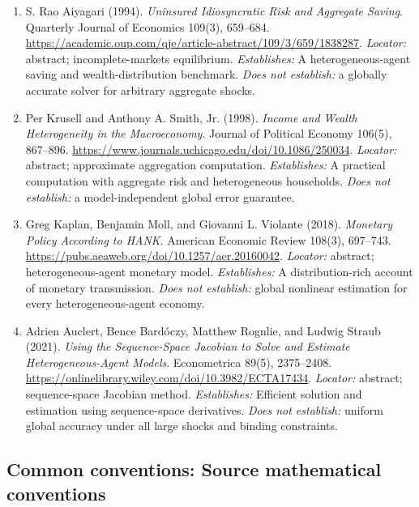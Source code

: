 \documentclass[11pt,a4paper]{article}
\begin{document}
\begin{enumerate}

\item[S1] S. Rao Aiyagari (1994). \emph{Uninsured Idiosyncratic Risk and Aggregate Saving}. Quarterly Journal of Economics 109(3), 659--684. \url{https://academic.oup.com/qje/article-abstract/109/3/659/1838287}. \textit{Locator:} abstract; incomplete-markets equilibrium. \textit{Establishes:} A heterogeneous-agent saving and wealth-distribution benchmark. \textit{Does not establish:} a globally accurate solver for arbitrary aggregate shocks.

\item[S2] Per Krusell and Anthony A. Smith, Jr. (1998). \emph{Income and Wealth Heterogeneity in the Macroeconomy}. Journal of Political Economy 106(5), 867--896. \url{https://www.journals.uchicago.edu/doi/10.1086/250034}. \textit{Locator:} abstract; approximate aggregation computation. \textit{Establishes:} A practical computation with aggregate risk and heterogeneous households. \textit{Does not establish:} a model-independent global error guarantee.

\item[S3] Greg Kaplan, Benjamin Moll, and Giovanni L. Violante (2018). \emph{Monetary Policy According to HANK}. American Economic Review 108(3), 697--743. \url{https://pubs.aeaweb.org/doi/10.1257/aer.20160042}. \textit{Locator:} abstract; heterogeneous-agent monetary model. \textit{Establishes:} A distribution-rich account of monetary transmission. \textit{Does not establish:} global nonlinear estimation for every heterogeneous-agent economy.

\item[S4] Adrien Auclert, Bence Bardóczy, Matthew Rognlie, and Ludwig Straub (2021). \emph{Using the Sequence-Space Jacobian to Solve and Estimate Heterogeneous-Agent Models}. Econometrica 89(5), 2375--2408. \url{https://onlinelibrary.wiley.com/doi/10.3982/ECTA17434}. \textit{Locator:} abstract; sequence-space Jacobian method. \textit{Establishes:} Efficient solution and estimation using sequence-space derivatives. \textit{Does not establish:} uniform global accuracy under all large shocks and binding constraints.

\end{enumerate}

\subsection*{Common conventions: Source mathematical conventions}
\end{document}

